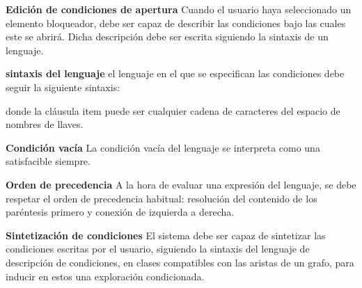 \item \textbf{Edición de condiciones de apertura}\newline
	Cuando el usuario haya seleccionado un elemento bloqueador, debe ser capaz de describir las condiciones bajo las cuales este se abrirá. Dicha descripción debe ser escrita siguiendo la sintaxis de un lenguaje.
	\begin{functional}
		\item \textbf{sintaxis del lenguaje}\newline
			el lenguaje en el que se especifican las condiciones debe seguir la siguiente sintaxis:
			
			donde la cláusula item puede ser cualquier cadena de caracteres del espacio de nombres de llaves.
		\item \textbf{Condición vacía}\newline
			La condición vacía del lenguaje se interpreta como una satisfacible siempre.
		\item \textbf{Orden de precedencia}\newline
			A la hora de evaluar una expresión del lenguaje, se debe respetar el orden de precedencia habitual: resolución del contenido de los paréntesis primero y conexión de izquierda a derecha.
	\end{functional}
\item \textbf{Sintetización de condiciones}\newline
	El sistema debe ser capaz de sintetizar las condiciones escritas por el usuario, siguiendo la sintaxis del lenguaje de descripción de condiciones, en clases compatibles con las aristas de un grafo, para inducir en estos una exploración condicionada.